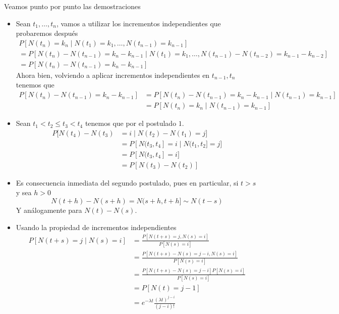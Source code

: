 \documentclass[twoside]{article}
\begin{document}
\begin{solucion}
Veamos punto por punto las demostraciones
\begin{itemize}
\item Sean $t_1,\dotsc,t_n$, vamos a utilizar los incrementos independientes que probaremos después
\begin{gather*}
P[N(t_n) =  k_n \mid N(t_1)=k_1,\dotsc,N(t_{n-1})=k_{n-1}] \\= P[N(t_n) -N(t_{n-1}) =  k_n - k_{n-1}\mid N(t_1)=k_1,\dotsc,N(t_{n-1})-N(t_{n-2})=k_{n-1}-k_{n-2}]\\
=P[N(t_n)-N(t_{n-1})=k_n - k_{n-1}]
\end{gather*}
Ahora bien, volviendo a aplicar incrementos independientes en $t_{n-1},t_n$ tenemos que 
\begin{align*}
P[N(t_n)-N(t_{n-1})=k_n - k_{n-1}] &= P[N(t_n)-N(t_{n-1})=k_n - k_{n-1}\mid N(t_{n-1}) = k_{n-1}]\\
&= P[N(t_n)=k_n \mid N(t_{n-1})=k_{n-1}]
\end{align*}
\item Sean $t_1<t_2\leq t_3<t_4$ tenemos que por el postulado $1$.
\begin{align*}
P[N(t_4)-N(t_3)& = i\mid N(t_2)-N(t_1)=j]\\
& = P[N(t_3,t_4]=i \mid N(t_1,t_2]=j] \\
&= P[N(t_3,t_4]=i] \\
&= P[N(t_3)-N(t_2)]
\end{align*}
\item Es consecuencia inmediata del segundo postulado, pues en particular, si $t>s$ y sea $h>0$
$$N(t+h)-N(s+h)=N(s+h,t+h] \sim N(t-s) $$
Y análogamente para $N(t)-N(s)$. 
\item Usando la propiedad de incrementos independientes
\begin{align*}
P[N(t+s)=j\mid N(s)=i] &= \frac{P[N(t+s)=j,  N(s)=i]}{P[N(s)=i]}\\
&=\frac{P[N(t+s)-N(s)=j-i,  N(s)=i]}{P[N(s)=i]}\\
&=\frac{P[N(t+s)-N(s)=j-i]P[N(s)=i]}{P[N(s)=i]}\\
&=P[N(t)=j-1]\\
&=e^{-\lambda t}\frac{(\lambda t)^{j-i}}{(j-i)!}
\end{align*}
\end{itemize}
\end{solucion}
\newpage
\end{document}
